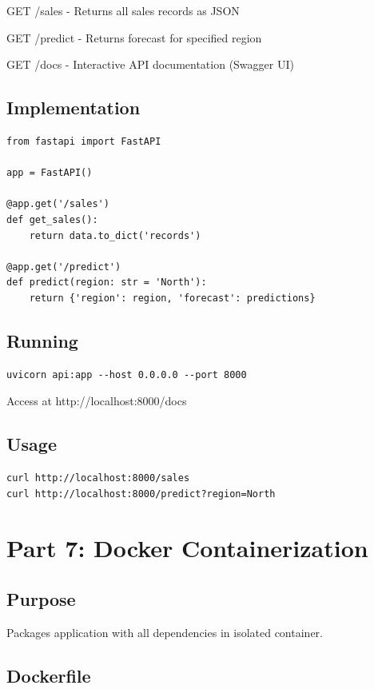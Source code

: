 \documentclass{article}
\begin{document}
GET /sales - Returns all sales records as JSON

GET /predict - Returns forecast for specified region

GET /docs - Interactive API documentation (Swagger UI)

\subsection{Implementation}

\begin{verbatim}
from fastapi import FastAPI

app = FastAPI()

@app.get('/sales')
def get_sales():
    return data.to_dict('records')

@app.get('/predict')
def predict(region: str = 'North'):
    return {'region': region, 'forecast': predictions}
\end{verbatim}

\subsection{Running}

\begin{verbatim}
uvicorn api:app --host 0.0.0.0 --port 8000
\end{verbatim}

Access at http://localhost:8000/docs

\subsection{Usage}

\begin{verbatim}
curl http://localhost:8000/sales
curl http://localhost:8000/predict?region=North
\end{verbatim}

\section{Part 7: Docker Containerization}

\subsection{Purpose}

Packages application with all dependencies in isolated container.

\subsection{Dockerfile}
\end{document}
